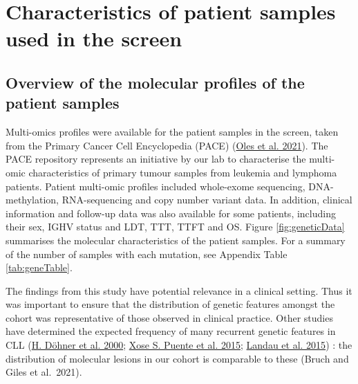 \documentclass[11pt, a4paper, twosided]{book}
\begin{document}
\hypertarget{characteristics-of-patient-samples-used-in-the-screen}{%
\section{Characteristics of patient samples used in the screen}\label{characteristics-of-patient-samples-used-in-the-screen}}

\hypertarget{overview-of-the-molecular-profiles-of-the-patient-samples}{%
\subsection{Overview of the molecular profiles of the patient samples}\label{overview-of-the-molecular-profiles-of-the-patient-samples}}

Multi-omics profiles were available for the patient samples in the screen, taken from the Primary Cancer Cell Encyclopedia (PACE) (\protect\hyperlink{ref-R-BloodCancerMultiOmics2017}{Oles et al. 2021}). The PACE repository represents an initiative by our lab to characterise the multi-omic characteristics of primary tumour samples from leukemia and lymphoma patients. Patient multi-omic profiles included whole-exome sequencing, DNA-methylation, RNA-sequencing and copy number variant data. In addition, clinical information and follow-up data was also available for some patients, including their sex, IGHV status and LDT, TTT, TTFT and OS. Figure \ref{fig:geneticData} summarises the molecular characteristics of the patient samples. For a summary of the number of samples with each mutation, see Appendix Table \ref{tab:geneTable}.

The findings from this study have potential relevance in a clinical setting. Thus it was important to ensure that the distribution of genetic features amongst the cohort was representative of those observed in clinical practice. Other studies have determined the expected frequency of many recurrent genetic features in CLL (\protect\hyperlink{ref-Dohner2000}{H. Döhner et al. 2000}; \protect\hyperlink{ref-Puente2015}{Xose S. Puente et al. 2015}; \protect\hyperlink{ref-Landau2015}{Landau et al. 2015}) : the distribution of molecular lesions in our cohort is comparable to these (Bruch and Giles et al.~2021).
\end{document}
